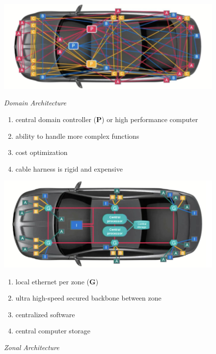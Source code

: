\begin{figure}[h]
    \centering
    \begin{minipage}[t]{0.45\textwidth}
        \centering
        \includegraphics[width=\textwidth]{img/domain_architecture}
        \caption{\textit{Domain Architecture}}
        
        \begin{flushleft}
            \begin{enumerate}[nosep]
                \item central domain controller (\textbf{P}) or high performance computer
                \item ability to handle more complex functions
                \item cost optimization
                \item cable harness is rigid and expensive
            \end{enumerate}
        \end{flushleft}

    \end{minipage}
    \begin{minipage}[t]{0.45\textwidth}
        \centering
        \includegraphics[width=\textwidth]{img/zonal_architecture}
        \caption{\textit{Zonal Architecture}}
        
        \begin{flushleft}
            \begin{enumerate}[nosep]
                \item local ethernet per zone (\textbf{G})
                \item ultra high-speed secured backbone between zone
                \item centralized software
                \item central computer storage
            \end{enumerate}
        \end{flushleft}
        
    \end{minipage}
\end{figure}

